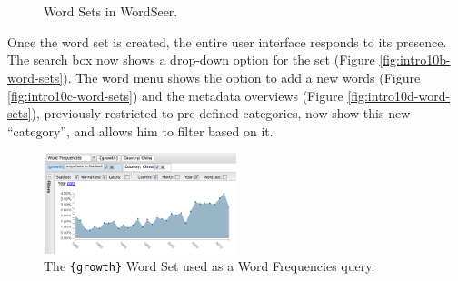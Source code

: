 \documentclass{sig-alternate}
\newcommand{\code}[1] {\texttt{#1}}
\begin{document}
\begin{figure}[ht!]
\begin{center}
%
        \\
         \\
        \quad
%
    \end{center}
    \caption{%
       Word Sets in WordSeer. \label{fig:intro10-word-sets}
     }%
\end{figure}
Once the word set is created, the entire user interface responds to its presence. The search box now shows a drop-down option for the set  (Figure \ref{fig:intro10b-word-sets}).  The word menu shows the option to add a new words (Figure \ref{fig:intro10c-word-sets}) and the metadata overviews (Figure \ref{fig:intro10d-word-sets}), previously restricted to pre-defined categories,  now show this new ``category'', and allows him to filter based on it.   

\begin{figure}[ht!]
\begin{center}
	\includegraphics[width=0.5\textwidth]{fig/chris/04a.png}
\end{center}
    \caption{%
	The \code{\{growth\}} Word Set used as a Word Frequencies query.\label{fig:chris04a}
     }%
\end{figure}
\end{document}
